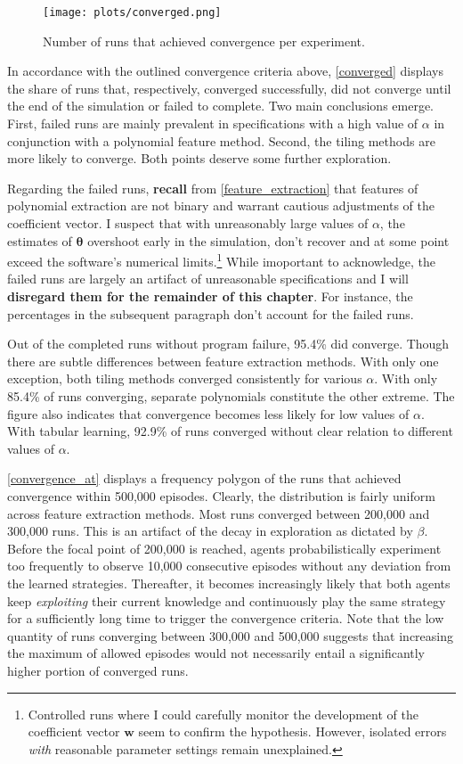 \begin{figure}
	\texttt{[image: plots/converged.png]}
	\caption{Number of runs that achieved convergence per experiment.}
	\label{converged}
\end{figure}

In accordance with the outlined convergence criteria above, \autoref{converged} displays the share of runs that, respectively, converged successfully, did not converge until the end of the simulation or failed to complete. Two main conclusions emerge. First, failed runs are mainly prevalent in specifications with a high value of $\alpha$ in conjunction with a polynomial feature method. Second, the tiling methods are more likely to converge. Both points deserve some further exploration.

Regarding the failed runs, \textbf{recall} from \autoref{feature_extraction} that features of polynomial extraction are not binary and warrant cautious adjustments of the coefficient vector. I suspect that with unreasonably large values of $\alpha$, the estimates of $\boldsymbol{\theta}$ overshoot early in the simulation, don't recover and at some point exceed the software's numerical limits.\footnote{Controlled runs where I could carefully monitor the development of the coefficient vector $\boldsymbol{w}$ seem to confirm the hypothesis. However, isolated errors \emph{with} reasonable parameter settings remain unexplained.} While imoportant to acknowledge, the failed runs are largely an artifact of unreasonable specifications and I will \textbf{disregard them for the remainder of this chapter}. For instance, the percentages in the subsequent paragraph don't account for the failed runs.

Out of the completed runs without program failure, 95.4\% did converge. Though there are subtle differences between feature extraction methods. With only one exception, both tiling methods converged consistently for various $\alpha$. With only 85.4\% of runs converging, separate polynomials constitute the other extreme. The figure also indicates that convergence becomes less likely for low values of $\alpha$. With tabular learning, 92.9\% of runs converged without clear relation to different values of $\alpha$.

\autoref{convergence_at} displays a frequency polygon of the runs that achieved convergence within 500,000 episodes. Clearly, the distribution is fairly uniform across feature extraction methods. Most runs converged between 200,000 and 300,000 runs. This is an artifact of the decay in exploration as dictated by $\beta$. Before the focal point of 200,000 is reached, agents probabilistically experiment too frequently to observe 10,000 consecutive episodes without any deviation from the learned strategies. Thereafter, it becomes increasingly likely that both agents keep \emph{exploiting} their current knowledge and continuously play the same strategy for a sufficiently long time to trigger the convergence criteria. Note that the low quantity of runs converging between 300,000 and 500,000 suggests that increasing the maximum of allowed episodes would not necessarily entail a significantly higher portion of converged runs.

